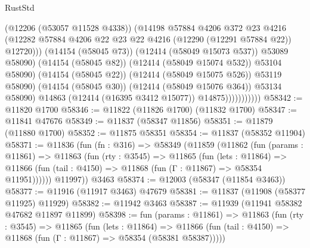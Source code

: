 \begin{lexlean}{RustStd}
\begin{coremodule}
{\begin{coremodule}
{{{{{{{{{{{{{{{{{{{{{{{{{{{{{{{{{{{{{{{{{{{{{{{{{{                                    (@12206 (@53057 @11528 @4338))
                                    (@14198
                                      @57884
                                      @4206
                                      @372
                                      @23
                                      @4216
                                      (@12282
                                        @57884
                                        @4206
                                        @22
                                        @23
                                        @22
                                        @4216
                                        (@12290 (@12291 @57884 @22))
                                        @12720)))
                                  (@14154 (@58045 @73))
                                  (@12414 (@58049 @15073 @537))
                                  @53089
                                  @58090)
                                (@14154 (@58045 @82))
                                (@12414 (@58049 @15074 @532))
                                @53104
                                @58090)
                              (@14154 (@58045 @22))
                              (@12414 (@58049 @15075 @526))
                              @53119
                              @58090)
                            (@14154 (@58045 @30))
                            (@12414 (@58049 @15076 @364))
                            @53134
                            @58090)
                          @14863
                          (@12414 (@16395 @3412 @15077))
                          @14875)))))))))))
@58342 := @11820 @1700
@58346 := @11822 (@11826 @1700) (@11832 @1700)
@58347 := @11841 @47676
@58349 := @11837 (@58347 @11856)
@58351 := @11879 (@11880 @1700)
@58352 := @11875 @58351
@58354 := @11837 (@58352 @11904)
@58371 := @11836
    (fun (fn : @316) =>
    @58349
      (@11859
        (@11862
          (fun (params : @11861) =>
          @11863
            (fun (rty : @3545) =>
            @11865
              (fun (lets : @11864) =>
              @11866 (fun (tail : @4150) => @11868 (fun (Γ : @11867) => @58354 @11951))))))
        @11997))
    @3463
@58374 := @12003 (@58347 (@11854 @3463))
@58377 := @11916 (@11917 @3463) @47679
@58381 := @11837 (@11908 (@58377 @11925) @11929)
@58382 := @11942 @3463
@58387 := @11939 (@11941 @58382 @47682 @11897 @11899)
@58398 := fun (params : @11861) =>
  @11863
    (fun (rty : @3545) =>
    @11865
      (fun (lets : @11864) =>
      @11866 (fun (tail : @4150) => @11868 (fun (Γ : @11867) => @58354 (@58381 @58387)))))
}}}}}}}}}}}}}}}}}}}}}}}}}}}}}}}}}}}}}}}}}}}}}}}}}}
\end{coremodule}}
\end{coremodule}
\end{lexlean}
